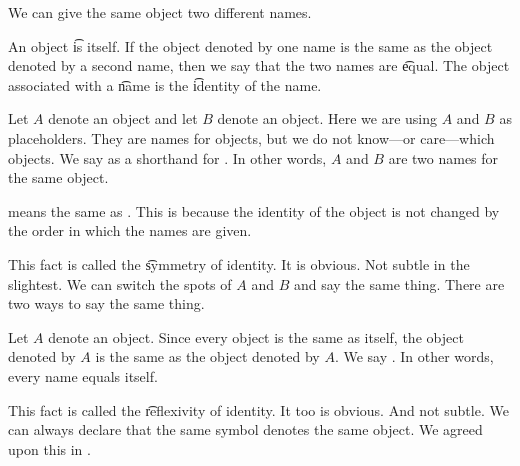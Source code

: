 

We can give the same object two different names.


An object \t{is} itself.
If the object denoted by one name is the same as the object denoted by a second name, then we say that the two names are \t{equal}.
The object associated with a \t{name} is the \t{identity} of the name.

Let $A$ denote an object and let $B$ denote an object.
Here we are using $A$ and $B$ as placeholders.
They are names for objects, but we do not know---or care---which objects.
We say  as a shorthand for .
In other words, $A$ and $B$ are two names for the same object.


 means the same as .
This is because the identity of the object is not changed by the order in which the names are given.

This fact is called the \t{symmetry of identity}.
It is obvious.
Not subtle in the slightest.
We can switch the spots of $A$ and $B$ and say the same thing.
There are two ways to say the same thing.



Let $A$ denote an object.
Since every object is the same as itself, the object denoted by $A$ is the same as the object denoted by $A$.
We say .
In other words, every name equals itself.

This fact is called the \t{reflexivity of identity}.
It too is obvious.
And not subtle.
We can always declare that the same symbol denotes the same object.
We agreed upon this in .

%
%
%
%

